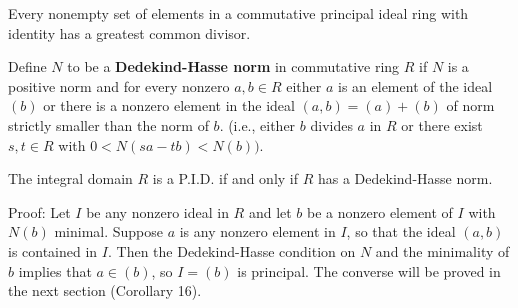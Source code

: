 \begin{corollary}
    Every nonempty set of elements in a commutative principal ideal ring with identity has a greatest common divisor.
\end{corollary}


\begin{definition}
    Define $N$ to be a \textbf{Dedekind-Hasse norm} in commutative ring $R$ if $N$ is a positive norm and for every nonzero $a, b \in R$ either $a$ is an element of the ideal  $\left(b\right)$ or there is a nonzero element in the ideal $(a, b)=\left(a\right)+\left(b\right)$ of norm strictly smaller than the norm of $b$. (i.e., either $b$ divides $a$ in $R$ or there exist $s, t \in R$ with $0<N(s a-t b)<N(b))$.
\end{definition}

\begin{theorem}
    The integral domain $R$ is a P.I.D. if and only if $R$ has a Dedekind-Hasse norm.

    Proof: Let $I$ be any nonzero ideal in $R$ and let $b$ be a nonzero element of $I$ with $N(b)$ minimal. Suppose $a$ is any nonzero element in $I$, so that the ideal $(a, b)$ is contained in $I$. Then the Dedekind-Hasse condition on $N$ and the minimality of $b$ implies that $a \in(b)$, so $I=(b)$ is principal. The converse will be proved in the next section (Corollary 16).
\end{theorem}

